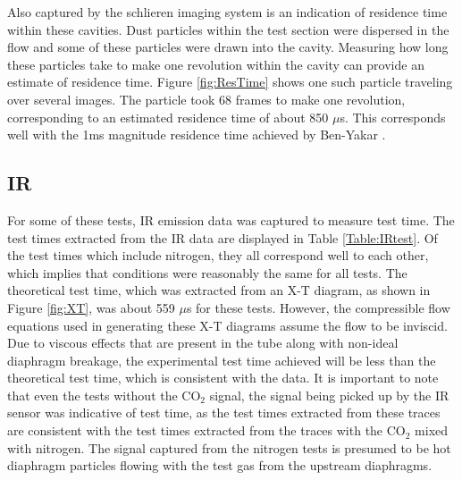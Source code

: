 Also captured by the schlieren imaging system is an indication of residence time within these cavities. Dust particles within the test section were dispersed in the flow and some of these particles were drawn into the cavity. Measuring how long these particles take to make one revolution within the cavity can provide an estimate of residence time. Figure \ref{fig:ResTime} shows one such particle traveling over several images. The particle took 68 frames to make one revolution, corresponding to an estimated residence time of about 850 $\mu$s. This corresponds well with the 1ms magnitude residence time achieved by Ben-Yakar \cite{ben2001cavity}.


\subsection{IR}

For some of these tests, IR emission data was captured to measure test time. The test times extracted from the IR data are displayed in Table \ref{Table:IRtest}. Of the test times which include nitrogen, they all correspond well to each other, which implies that conditions were reasonably the same for all tests.  The theoretical test time, which was extracted from an X-T diagram, as shown in Figure \ref{fig:XT}, was about 559 $\mu$s for these tests. However, the compressible flow equations used in generating these X-T diagrams assume the flow to be inviscid. Due to viscous effects that are present in the tube along with non-ideal diaphragm breakage, the experimental test time achieved will be less than the theoretical test time, which is consistent with the data. It is important to note that even the tests without the CO$_2$ signal, the signal being picked up by the IR sensor was indicative of test time, as the test times extracted from these traces are consistent with the test times extracted from the traces with the CO$_2$ mixed with nitrogen. The signal captured from the nitrogen tests is presumed to be hot diaphragm particles flowing with the test gas from the upstream diaphragms.

